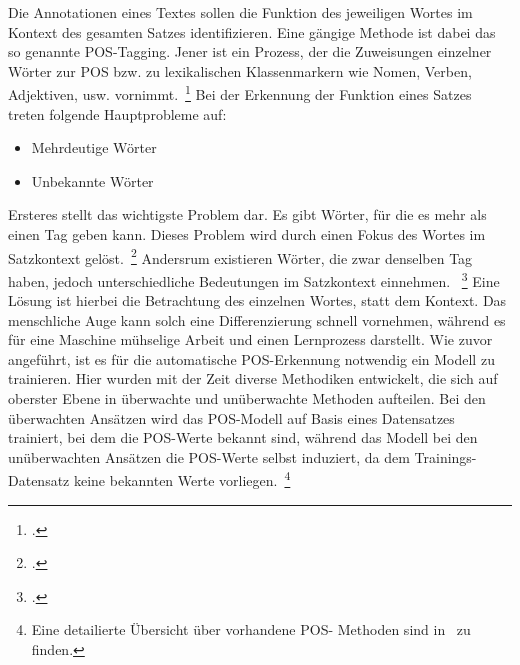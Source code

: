 Die Annotationen eines Textes sollen die Funktion des jeweiligen Wortes im Kontext des gesamten Satzes identifizieren.
Eine gängige Methode ist dabei das so genannte \ac{POS}-Tagging.
Jener ist ein Prozess, der die Zuweisungen einzelner Wörter zur \ac{POS} bzw{.} zu lexikalischen Klassenmarkern wie
Nomen, Verben, Adjektiven, usw{.} vornimmt.~\footcite[\vglf][]{kumawat.2015}
Bei der Erkennung der Funktion eines Satzes treten folgende Hauptprobleme auf:
\begin{itemize}
    \item Mehrdeutige Wörter
    \item Unbekannte Wörter
\end{itemize}
Ersteres stellt das wichtigste Problem dar.
Es gibt Wörter, für die es mehr als einen Tag geben kann.
Dieses Problem wird durch einen Fokus des Wortes im Satzkontext gelöst.~\footcite[\vglf][]{gurleenkaursidhu.2013}
Andersrum existieren Wörter, die zwar denselben Tag haben, jedoch unterschiedliche Bedeutungen im Satzkontext einnehmen.
~\footcite[\vglf][]{gurleenkaursidhu.2013} Eine Lösung ist hierbei die Betrachtung des einzelnen Wortes, statt dem
Kontext.
Das menschliche Auge kann solch eine Differenzierung schnell vornehmen, während es für eine Maschine mühselige Arbeit
und einen Lernprozess darstellt.
Wie zuvor angeführt, ist es für die automatische \ac{POS}-Erkennung notwendig ein Modell zu trainieren.
Hier wurden mit der Zeit diverse Methodiken entwickelt, die sich auf oberster Ebene in überwachte und unüberwachte
Methoden aufteilen.
Bei den überwachten Ansätzen wird das \ac{POS}-Modell auf Basis eines Datensatzes trainiert, bei dem die \ac{POS}-Werte
bekannt sind, während das Modell bei den unüberwachten Ansätzen die \ac{POS}-Werte selbst induziert, da dem
Trainings-Datensatz keine bekannten Werte vorliegen.~\footnote{Eine detailierte Übersicht über vorhandene \ac{POS}-
Methoden sind in~\cite{kumawat.2015} zu finden.}



